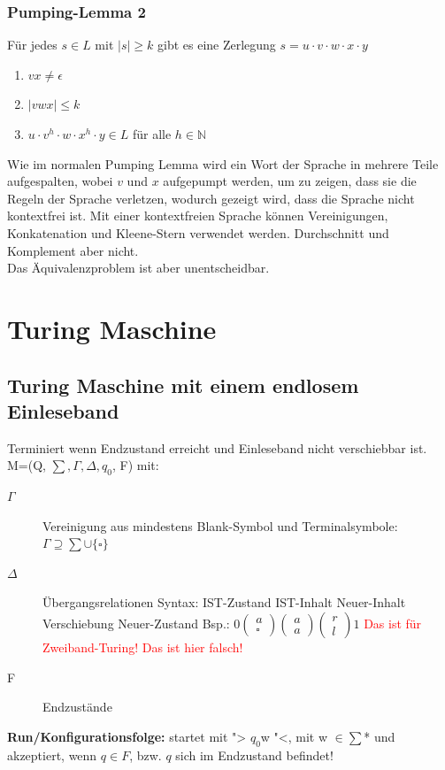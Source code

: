 \documentclass[12pt,a4paper]{article}
\begin{document}
	\subsubsection{Pumping-Lemma 2}
	Für jedes $s \in L$ mit $|s| \geq k$ gibt es eine Zerlegung $s = u \cdot v \cdot w \cdot x \cdot y$
	\begin{enumerate}
	\item $vx \neq \epsilon$
	\item $|vwx| \leq k$
	\item $u \cdot v^h \cdot w \cdot x^h \cdot y \in L $ für alle $h \in \mathbb{N}$
	\end{enumerate}
	Wie im normalen Pumping Lemma wird ein Wort der Sprache in mehrere Teile aufgespalten, wobei $v$ und $x$ aufgepumpt werden, um zu zeigen, dass sie die Regeln der Sprache verletzen, wodurch gezeigt wird, dass die Sprache nicht kontextfrei ist.\newline
	Mit einer kontextfreien Sprache können Vereinigungen, Konkatenation und Kleene-Stern verwendet werden. Durchschnitt und Komplement aber nicht.\\
	Das Äquivalenzproblem ist aber unentscheidbar.
	

\section{Turing Maschine}
	\subsection{Turing Maschine mit einem endlosem Einleseband}
	Terminiert wenn Endzustand erreicht und Einleseband nicht verschiebbar ist.\\
	M=(Q, $\sum, \Gamma , \Delta , q_0$, F) mit:\\
	\begin{description}
		\item[$\Gamma$] Vereinigung aus mindestens Blank-Symbol und Terminalsymbole: $\Gamma \supseteq \sum \cup \{ \square \} $
		\item[$\Delta$] Übergangsrelationen Syntax: IST-Zustand IST-Inhalt Neuer-Inhalt Verschiebung Neuer-Zustand Bsp.: $0 \left( \begin{array}{c} a \\ \square \end{array}\right) \left( \begin{array}{c} a \\ a \end{array}\right) \left( \begin{array}{c} r \\ l \end{array} \right) 1$ \textcolor{red}{Das ist für Zweiband-Turing! Das ist hier falsch!}
		\item[F] Endzustände
	\end{description}
	\textbf{Run/Konfigurationsfolge:} startet mit "> $q_0$w "<, mit w $\in \sum$* und akzeptiert, wenn $q \in F$, bzw. $q$ sich im Endzustand befindet!
\end{document}
